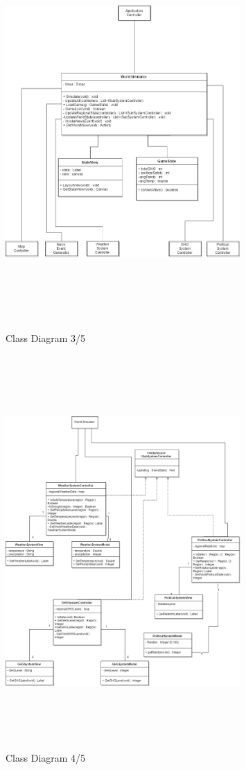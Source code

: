 \documentclass[]{article}
\begin{document}
\pagebreak
\begin{figure}[h]
    \centering
    \includegraphics[width=0.8\textwidth , height=15cm, keepaspectratio]{dcdWS}
    \caption{Class Diagram 3/5}
    \label{fig:dcdTL}
\end{figure}

\pagebreak
\begin{figure}[h]
    \centering
    \includegraphics[width=0.8\textwidth , height=15cm, keepaspectratio]{dcdSS}
    \caption{Class Diagram 4/5}
    \label{fig:dcdTL}
\end{figure}
\end{document}

